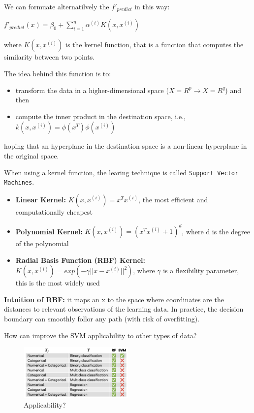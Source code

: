 \begin{definitionblock}[Kernel]
    We can formuate alternatilvely the $f'_{predict}$ in this way:
    \begin{center}
        $f'_{predict}(x) = \beta_0 + \sum_{i=1}^{n}\alpha^{(i)}K(x, x^{(i)})$
    \end{center}
    where $K(x, x^{(i)})$ is the kernel function, that is a function that computes the similarity between two points.

    The idea behind this function is to:
    \begin{itemize}
        \item transform the data in a higher-dimensional space ($X = R^p \to X = R^q$) and then 
        \item compute the inner product in the destination space, i.e., $k(x,x^{(i)}) = \phi(x^T)\phi(x^{(i)})$
    \end{itemize}
    hoping that an hyperplane in the destination space is a non-linear hyperplane in the original space.
\end{definitionblock}

When using a kernel function, the learing technique is called \texttt{Support Vector Machines}.

\begin{exampleblock}
    \begin{itemize}
        \item \textbf{Linear Kernel:} $K(x, x^{(i)}) = x^T x^{(i)}$, the most efficient and computationally cheapest
        \item \textbf{Polynomial Kernel:} $K(x, x^{(i)}) = (x^T x^{(i)} + 1)^d$, where d is the degree of the polynomial
        \item \textbf{Radial Basis Function (RBF) Kernel:} $K(x, x^{(i)}) = exp(-\gamma ||x - x^{(i)}||^2)$, where $\gamma$ is a flexibility parameter, this is the most widely used 
    \end{itemize}
\end{exampleblock}

\textbf{Intuition of RBF:} it maps an x to the space where coordinates are the distances to relevant observations of the learning data. In practice, the decision boundary can smoothly follor any path (with risk of overfitting).

How can improve the SVM applicability to other types of data?

\begin{figure}[H]
    \centering
    \includegraphics[width=0.5\textwidth]{assets/fig31.png}
    \caption{Applicability?}
\end{figure}

